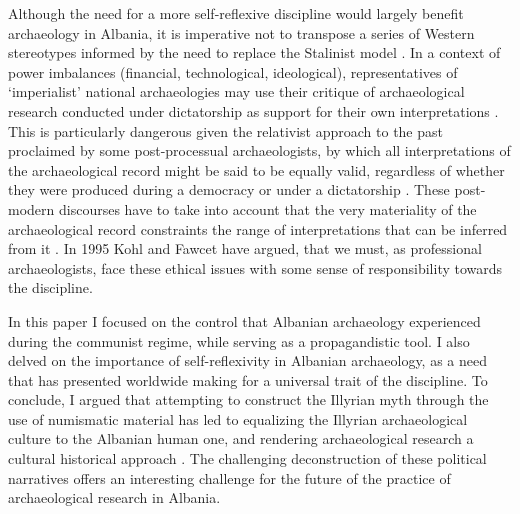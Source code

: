 	
	Although the need for a more self-reflexive discipline would largely benefit archaeology in Albania, it is imperative not to transpose a series of Western stereotypes informed by the need to replace the Stalinist model \parencite[161]{Hodges2004}. In a context of power imbalances (financial, technological, ideological), representatives of `imperialist' national archaeologies \parencite[Trigger 1984 cited in][]{Galaty2006} may use their critique of archaeological research conducted under dictatorship as support for their own interpretations \parencite[13]{Galaty2006}. This is particularly dangerous given the relativist approach to the past proclaimed by some post-processual archaeologists, by which all interpretations of the archaeological record might be said to be equally valid, regardless of whether they were produced during a democracy or under a dictatorship \parencite[Meskell 1998 cited in][]{Galaty2006}. These post-modern discourses \parencite[Meskell 1998 cited in][]{Galaty2006} have to take into account that the very materiality of the archaeological record constraints the range of interpretations that can be inferred from it \parencite[200]{Hodder1999}. 
	In 1995 Kohl and Fawcet   \parencite[cited in][]{Galaty2006} have argued, that we must, as professional archaeologists, face these ethical issues with some sense of responsibility towards the discipline.
	
	In this paper I focused on the control that Albanian archaeology experienced during the communist regime, while serving as a propagandistic tool. I also delved on the importance of self-reflexivity in Albanian archaeology, as a need that has presented worldwide making for a universal trait of the discipline. To conclude, I argued that attempting to construct the Illyrian myth through the use of numismatic material has led to equalizing the Illyrian archaeological culture to the Albanian human one, and rendering archaeological research a cultural historical approach \parencite[18]{Johnson2010}. The challenging deconstruction of these political narratives offers an interesting challenge for the future of the practice of archaeological research in Albania.
			

